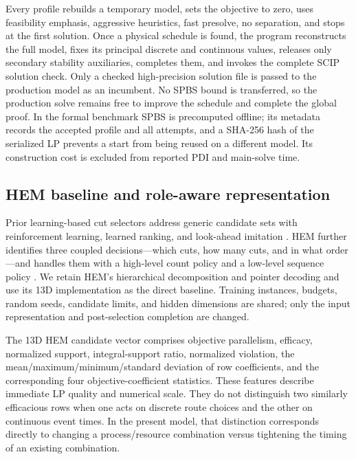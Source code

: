 \documentclass[final,5p,times,twocolumn]{elsarticle}
\begin{document}
Every profile rebuilds a temporary model, sets the objective to zero, uses feasibility emphasis, aggressive heuristics, fast presolve, no separation, and stops at the first solution. Once a physical schedule is found, the program reconstructs the full model, fixes its principal discrete and continuous values, releases only secondary stability auxiliaries, completes them, and invokes the complete SCIP solution check. Only a checked high-precision solution file is passed to the production model as an incumbent. No SPBS bound is transferred, so the production solve remains free to improve the schedule and complete the global proof. In the formal benchmark SPBS is precomputed offline; its metadata records the accepted profile and all attempts, and a SHA-256 hash of the serialized LP prevents a start from being reused on a different model. Its construction cost is excluded from reported PDI and main-solve time.

\subsection{HEM baseline and role-aware representation}

Prior learning-based cut selectors address generic candidate sets with reinforcement learning, learned ranking, and look-ahead imitation \citep{tang2020cut,huang2022cutranking,paulus2022looking}. HEM further identifies three coupled decisions---which cuts, how many cuts, and in what order---and handles them with a high-level count policy and a low-level sequence policy \citep{wang2023hem}. We retain HEM's hierarchical decomposition and pointer decoding and use its 13D implementation as the direct baseline. Training instances, budgets, random seeds, candidate limits, and hidden dimensions are shared; only the input representation and post-selection completion are changed.

The 13D HEM candidate vector comprises objective parallelism, efficacy, normalized support, integral-support ratio, normalized violation, the mean/maximum/minimum/standard deviation of row coefficients, and the corresponding four objective-coefficient statistics. These features describe immediate LP quality and numerical scale. They do not distinguish two similarly efficacious rows when one acts on discrete route choices and the other on continuous event times. In the present model, that distinction corresponds directly to changing a process/resource combination versus tightening the timing of an existing combination.
\end{document}
